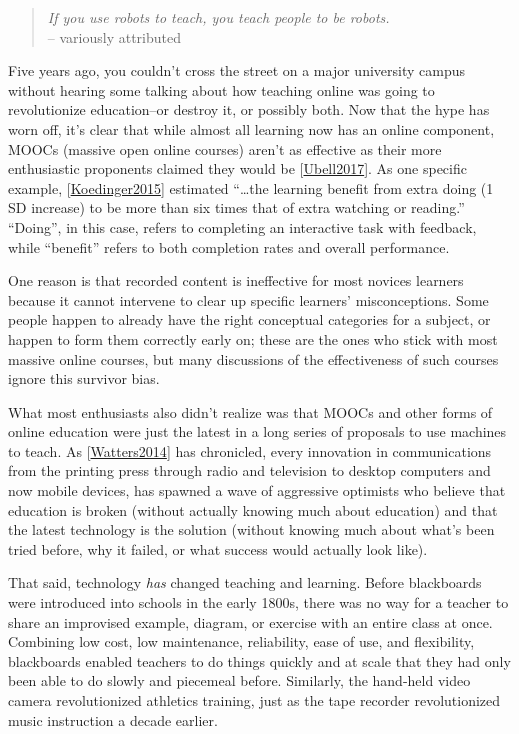 \documentclass[10pt,statementpaper]{memoir}
\begin{document}
\begin{quote}
\emph{If you use robots to teach, you teach people to be robots.}\\
-- variously attributed
\end{quote}

Five years ago, you couldn't cross the street on a major university
campus without hearing some talking about how teaching online was going
to revolutionize education--or destroy it, or possibly both. Now that
the hype has worn off, it's clear that while almost all learning now has
an online component, MOOCs (massive open online courses) aren't as
effective as their more enthusiastic proponents claimed they would be
{[}\href{biblio.html\#ubell-moocs}{Ubell2017}{]}. As one specific
example,
{[}\href{biblio.html\#koedinger-doing-watching}{Koedinger2015}{]}
estimated ``\ldots{}the learning benefit from extra doing (1 SD
increase) to be more than six times that of extra watching or reading.''
``Doing'', in this case, refers to completing an interactive task with
feedback, while ``benefit'' refers to both completion rates and overall
performance.

One reason is that recorded content is ineffective for most novices
learners because it cannot intervene to clear up specific learners'
misconceptions. Some people happen to already have the right conceptual
categories for a subject, or happen to form them correctly early on;
these are the ones who stick with most massive online courses, but many
discussions of the effectiveness of such courses ignore this survivor
bias.

What most enthusiasts also didn't realize was that MOOCs and other forms
of online education were just the latest in a long series of proposals
to use machines to teach. As
{[}\href{biblio.html\#watters-monsters}{Watters2014}{]} has chronicled,
every innovation in communications from the printing press through radio
and television to desktop computers and now mobile devices, has spawned
a wave of aggressive optimists who believe that education is broken
(without actually knowing much about education) and that the latest
technology is the solution (without knowing much about what's been tried
before, why it failed, or what success would actually look like).

That said, technology \emph{has} changed teaching and learning. Before
blackboards were introduced into schools in the early 1800s, there was
no way for a teacher to share an improvised example, diagram, or
exercise with an entire class at once. Combining low cost, low
maintenance, reliability, ease of use, and flexibility, blackboards
enabled teachers to do things quickly and at scale that they had only
been able to do slowly and piecemeal before. Similarly, the hand-held
video camera revolutionized athletics training, just as the tape
recorder revolutionized music instruction a decade earlier.
\end{document}
